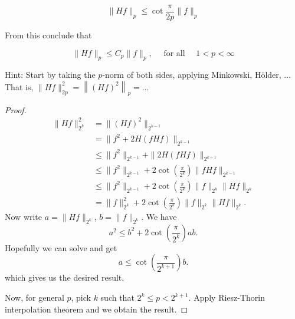 \begin{enumerate}
\[
\|H f\|_p \leq \cot \frac{\pi}{2 p}\|f\|_p
\]


From this conclude that

\[
\|H f\|_p \leq C_p\|f\|_p, \quad \text { for all } \quad 1<p<\infty
\]


Hint: Start by taking the $p$-norm of both sides, applying Minkowski, Hölder, $\ldots$ That is, $\|H f\|_{2 p}^2=\left\|(H f)^2\right\|_p=\ldots$

\begin{proof}
	\begin{align*}
		\|H f\|_{2^k }^2
		&= \|(H f)^2\|_{2^{k - 1}} \\
		&= \|f^2 + 2 H (f H f)\|_{2^{k - 1} } \\
		&\leq \|f^2 \|_{2^{k - 1}}+ \|2 H (f H f)\|_{2^{k - 1} } \\
		&\leq \|f^2 \|_{2^{k - 1}}+ 2 \cot \left( \frac{\pi}{2^k } \right) \|f H f\|_{2^{k - 1} } \\
		&\leq \|f^2 \|_{2^{k - 1}}+ 2 \cot \left( \frac{\pi}{2^k } \right) \|f\|_{2^k } \| H f\|_{2^{k } } \\
		&= \|f\|_{2^{k}}^2 + 2 \cot \left( \frac{\pi}{2^k } \right) \|f\|_{2^k } \| H f\|_{2^{k } }
	.\end{align*}
	Now write $a = \|H f\|_{2^k }$, $b = \|f\|_{2^k }$. We have
	\[
		a^2 \le b^2 +2 \cot \left( \frac{\pi}{2^k } \right) a b
	.\] 
	Hopefully we can solve and get
	\[
		a \le  \cot \left( \frac{\pi}{2^{k + 1}} \right) b
	.\] 
	which gives us the desired result.


	Now, for general $p$, pick $k$ such that $2^k \le p < 2^{k + 1}$. Apply Riesz-Thorin interpolation theorem and we obtain the result.
\end{proof}





\end{enumerate}
